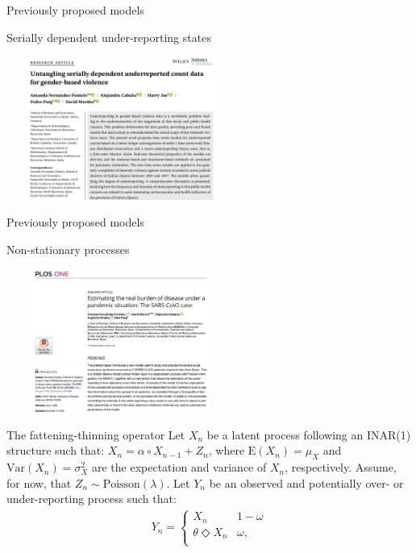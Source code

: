 \documentclass[aspectratio=169,usepdftitle=true]{beamer}
\begin{document}
\begin{frame}[c]{Previously proposed models}
    \begin{block}{Serially dependent under-reporting states}
        \begin{center}
           \includegraphics[height=4.7cm,width=7.5cm]{SiM2.png}
        \end{center}
    \end{block}
\end{frame}

\begin{frame}[c]{Previously proposed models}
    \begin{block}{Non-stationary processes}
        \begin{center}
           \includegraphics[height=4.7cm,width=7.5cm]{Plos.png}
        \end{center}
    \end{block}
\end{frame}

\begin{frame}{The fattening-thinning operator}
Let $X_n$ be a latent process following an INAR(1) structure such that: $X_n=\alpha\circ X_{n-1}+Z_n$, where $\textrm{E}(X_n)=\mu_X$ and $\textrm{Var}(X_n)=\sigma_X^2$ are the expectation and variance of $X_n$, respectively. Assume, for now, that $Z_n \sim \textrm{Poisson}(\lambda)$. Let $Y_n$ be an observed and potentially over- or under-reporting process such that: 
\begin{align}\label{eq0:modelfatthin}
 Y_n=\begin{cases} 
X_n &  1-\omega \\
\theta \Diamond X_n & \omega, \\
   \end{cases}
\end{align}
\end{frame}
\end{document}

